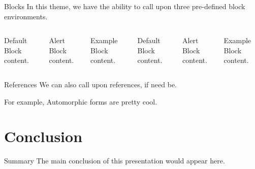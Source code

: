 \documentclass[10pt]{beamer}
\begin{document}
\begin{frame}{Blocks}
  In this theme, we have the ability to call upon three pre-defined block environments.
  \begin{columns}[T,onlytextwidth]
      \begin{block}{Default}
        Block content.
      \end{block}

      \begin{alertblock}{Alert}
        Block content.
      \end{alertblock}

      \begin{exampleblock}{Example}
        Block content.
      \end{exampleblock}



      \begin{block}{Default}
        Block content.
      \end{block}

      \begin{alertblock}{Alert}
        Block content.
      \end{alertblock}

      \begin{exampleblock}{Example}
        Block content.
      \end{exampleblock}

  \end{columns}
\end{frame}

\begin{frame}{References}
  We can also call upon references, if need be. 
  
  For example, Automorphic forms are pretty cool. \cite{Bump96}
\end{frame}

\section{Conclusion}

\begin{frame}{Summary}
  The main conclusion of this presentation would appear here.
\end{frame}
\end{document}
